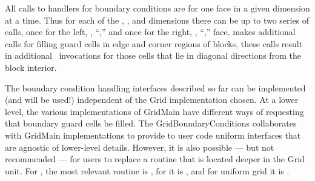 All calls to handlers for boundary conditions are for one face in a given
dimension at a time. Thus for each of the
, , and  dimensions there can be up to
two series of calls, once for
the left, \ie, ``,'' and once for the right, \ie,
``,'' face.   makes additional calls
for filling guard cells in edge and corner regions of blocks,
these calls result in additional \ invocations
for those cells that lie in diagonal directions from the block interior.

The boundary condition handling interfaces described so far can
be implemented (and will be used!) independent of the \unit{Grid}
implementation chosen. At a lower level, the various implementations
of \unit{GridMain} have different ways of requesting that
boundary guard cells be filled. The \unit{GridBoundaryConditions} \subunit
collaborates with \unit{GridMain} implementations to provide to user code
uniform interfaces that are agnostic of lower-level details.
However, it is also possible --- but not recommended --- for users to
replace a routine that is located
deeper in the \unit{Grid} unit. For , the most relevant
routine is , for  it is
, and for uniform grid  it is
.

